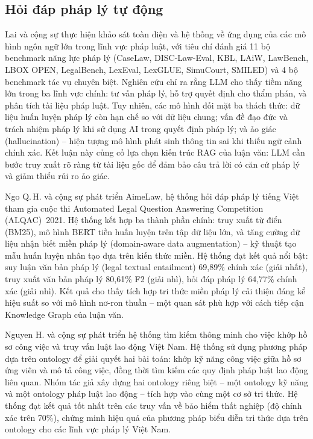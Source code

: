 \subsection{Hỏi đáp pháp lý tự động}
\label{subsec:hoi-dap-phap-ly}

Lai và cộng sự \cite{lai2024llmlaw} thực hiện khảo sát toàn diện và hệ thống về ứng
dụng của các mô hình ngôn ngữ lớn trong lĩnh vực pháp luật, với tiêu chí đánh giá
11 bộ benchmark năng lực pháp lý (CaseLaw, DISC-Law-Eval, KBL, LAiW, LawBench, LBOX
OPEN, LegalBench, LexEval, LexGLUE, SimuCourt, SMILED) và 4 bộ benchmark tác vụ
chuyên biệt. Nghiên cứu chỉ ra rằng LLM cho thấy tiềm năng lớn trong ba lĩnh vực
chính: tư vấn pháp lý, hỗ trợ quyết định cho thẩm phán, và phân tích tài liệu pháp
luật. Tuy nhiên, các mô hình đối mặt ba thách thức: dữ liệu huấn luyện pháp lý
còn hạn chế so với dữ liệu chung; vấn đề đạo đức và trách nhiệm pháp lý khi sử
dụng AI trong quyết định pháp lý; và ảo giác (hallucination) -- hiện tượng mô
hình phát sinh thông tin sai khi thiếu ngữ cảnh chính xác. Kết luận này củng cố lựa
chọn kiến trúc RAG của luận văn: LLM cần bước truy xuất rõ ràng từ tài liệu gốc để
đảm bảo câu trả lời có căn cứ pháp lý và giảm thiểu rủi ro ảo giác.

Ngo Q.\,H. và cộng sự \cite{ngo2021aimelaw} phát triển AimeLaw, hệ thống hỏi đáp pháp lý
tiếng Việt tham gia cuộc thi Automated Legal Question Answering Competition
(ALQAC)~2021. Hệ thống kết hợp ba thành phần chính: truy xuất từ điển (BM25), mô
hình BERT tiền huấn luyện trên tập dữ liệu lớn, và tăng cường dữ liệu nhận biết
miền pháp lý (domain-aware data augmentation) -- kỹ thuật tạo mẫu huấn luyện nhân
tạo dựa trên kiến thức miền. Hệ thống đạt kết quả nổi bật: suy luận văn bản pháp
lý (legal textual entailment) 69,89\% chính xác (giải nhất), truy xuất văn bản pháp
lý 80,61\% F2 (giải nhì), hỏi đáp pháp lý 64,77\% chính xác (giải nhì). Kết quả
cho thấy tích hợp tri thức miền pháp lý cải thiện đáng kể hiệu suất so với mô hình
nơ-ron thuần -- một quan sát phù hợp với cách tiếp cận Knowledge Graph của luận văn.

Nguyen H. và cộng sự \cite{nguyen2024intelligent} phát triển hệ thống tìm kiếm thông
minh cho việc khớp hồ sơ công việc và truy vấn luật lao động Việt Nam. Hệ thống sử
dụng phương pháp dựa trên ontology để giải quyết hai bài toán: khớp kỹ năng
công việc giữa hồ sơ ứng viên và mô tả công việc, đồng thời tìm kiếm các quy định
pháp luật lao động liên quan. Nhóm tác giả xây dựng hai ontology riêng biệt -- một
ontology kỹ năng và một ontology pháp luật lao động -- tích hợp vào cùng một cơ sở
tri thức. Hệ thống đạt kết quả tốt nhất trên các truy vấn về bảo hiểm thất nghiệp
(độ chính xác trên 70\%), chứng minh hiệu quả của phương pháp biểu diễn tri thức
dựa trên ontology cho các lĩnh vực pháp lý Việt Nam.

